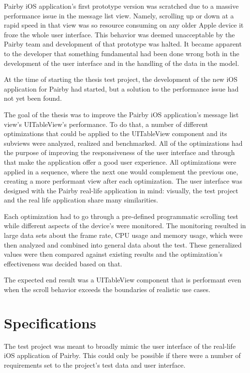 \documentclass[a4paper,12pt]{article}
\begin{document}
Pairby iOS application's first prototype version was scratched due to a massive performance issue in the message list view. Namely, scrolling up or down at a rapid speed in that view was so resource consuming on any older Apple device it froze the whole user interface. This behavior was deemed unacceptable by the Pairby team and development of that prototype was halted. It became apparent to the developer that something fundamental had been done wrong both in the development of the user interface and in the handling of the data in the model.

At the time of starting the thesis test project, the development of the new iOS application for Pairby had started, but a solution to the performance issue had not yet been found.

The goal of the thesis was to improve the Pairby iOS application's message list view's UITableView's performance. To do that, a number of different optimizations that could be applied to the UITableView component and its subviews were analyzed, realized and benchmarked. All of the optimizations had the purpose of improving the responsiveness of the user interface and through that make the application offer a good user experience. All optimizations were applied in a sequence, where the next one would complement the previous one, creating a more performant view after each optimization. The user interface was designed with the Pairby real-life application in mind: visually, the test project and the real life application share many similarities.

Each optimization had to go through a pre-defined programmatic scrolling test while different aspects of the device's were monitored. The monitoring resulted in large data sets about the frame rate, CPU usage and memory usage, which were then analyzed and combined into general data about the test. These generalized values were then compared against existing results and the optimization's effectiveness was decided based on that.

The expected end result was a UITableView component that is performant even when the scroll behavior exceeds the boundaries of realistic use cases.

\newpage
\section{Specifications}
The test project was meant to broadly mimic the user interface of the real-life iOS application of Pairby. This could only be possible if there were a number of requirements set to the project's test data and user interface.
\end{document}
